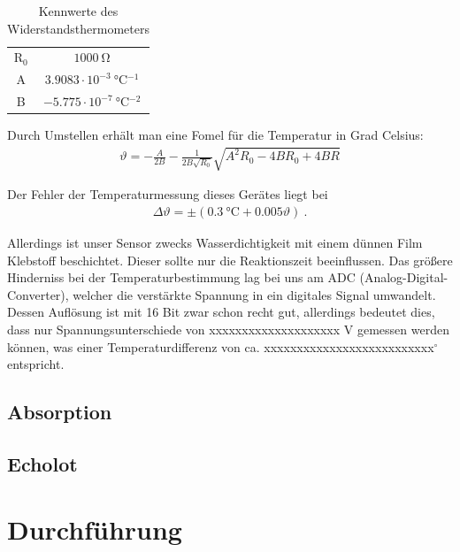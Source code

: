 \documentclass[12pt,a4paper,titlepage,headinclude,bibtotoc]{scrartcl}
\begin{document}
\begin{table}[!htb]
	\centering
	\begin{tabular}{|c|c|}
		\hline
		R$_0$ & $1000 ~ \si{\ohm}$\\
		A   & $3.9083 \cdot 10^{-3} ~ \si{\celsius^{-1}}$\\
		B   & $-5.775 \cdot 10^{-7} ~ \si{\celsius^{-2}}$\\
		\hline
	\end{tabular}
	\caption{Kennwerte des Widerstandsthermometers}
	\label{tab:Pt1000}
\end{table}

Durch Umstellen erhält man eine Fomel für die Temperatur in Grad Celsius:
\begin{align}
 \vartheta = -\frac{A}{2 B} - \frac{1}{2 B \sqrt{R_0}} \sqrt{A^2 R_0  - 4 B R_0 + 4 B R    } 
\end{align}




Der Fehler der Temperaturmessung dieses Gerätes liegt bei
\begin{align}
	\Delta\vartheta=\pm (0.3~\si{\celsius}+0.005\vartheta)~.
	\label{eq:Pt1000_fehler}
\end{align}

Allerdings ist unser Sensor zwecks Wasserdichtigkeit mit einem dünnen Film Klebstoff beschichtet.
Dieser sollte nur die Reaktionszeit beeinflussen.
Das größere Hinderniss bei der Temperaturbestimmung lag bei uns am ADC (Analog-Digital-Converter), welcher die verstärkte Spannung in ein digitales Signal umwandelt.
Dessen Auflösung ist mit 16 Bit zwar schon recht gut, allerdings bedeutet dies, dass nur Spannungsunterschiede von xxxxxxxxxxxxxxxxxxxx V gemessen werden können, was einer Temperaturdifferenz von ca. xxxxxxxxxxxxxxxxxxxxxxxxxx$^\circ$ entspricht.


\subsection{Absorption}

\subsection{Echolot}
                                                                                                                                                                      
\section{Durchführung}
\label{sec:durchfuehrung}
\end{document}
